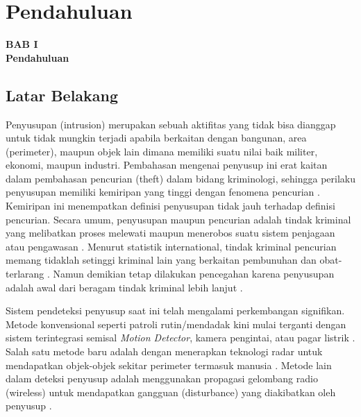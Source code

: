 \documentclass[12pt]{article}
\begin{document}
\newpage
\thispagestyle{plain}
\mbox{}

\newpage

	\setcounter{page}{9}

	\setcounter{section}{0}
	\section{Pendahuluan}
	
	\begin{center}
		{\large \textbf{BAB I}} \\
		{\large \textbf{Pendahuluan}}
	\end{center}
	
	\subsection{Latar Belakang}
	
	Penyusupan (intrusion) merupakan sebuah aktifitas yang tidak bisa dianggap untuk tidak mungkin terjadi apabila berkaitan dengan bangunan, area (perimeter), maupun objek lain dimana memiliki suatu nilai baik militer, ekonomi, maupun industri\cite{Assets}.
	Pembahasan mengenai penyusup ini erat kaitan dalam pembahasan pencurian (theft) dalam bidang kriminologi, sehingga perilaku penyusupan memiliki kemiripan yang tinggi dengan fenomena pencurian \cite{Felson1998}.
	Kemiripan ini menempatkan definisi penyusupan tidak jauh terhadap definisi pencurian. Secara umum, penyusupan maupun pencurian adalah tindak kriminal yang melibatkan proses melewati maupun menerobos suatu sistem penjagaan atau pengawasan \cite{Chapman}.
	Menurut statistik international, tindak kriminal pencurian memang tidaklah setinggi kriminal lain yang berkaitan pembunuhan dan obat-terlarang \cite{Frate2010}.
	Namun demikian tetap dilakukan pencegahan karena penyusupan adalah awal dari beragam tindak kriminal lebih lanjut \cite{Nesbit}.
	
	Sistem pendeteksi penyusup saat ini telah mengalami perkembangan signifikan.
	Metode konvensional seperti patroli rutin/mendadak kini mulai terganti dengan sistem terintegrasi semisal \textit{Motion Detector}, kamera pengintai, atau pagar listrik \cite{AFL2011}.
	Salah satu metode baru adalah dengan menerapkan teknologi radar untuk mendapatkan objek-objek sekitar perimeter termasuk manusia \cite{Cory1998}.
	Metode lain dalam deteksi penyusup adalah menggunakan propagasi gelombang radio (wireless) untuk mendapatkan gangguan (disturbance) yang diakibatkan oleh penyusup \cite{Elmorsy}\cite{Elmorsy2014}.
	
\end{document}
